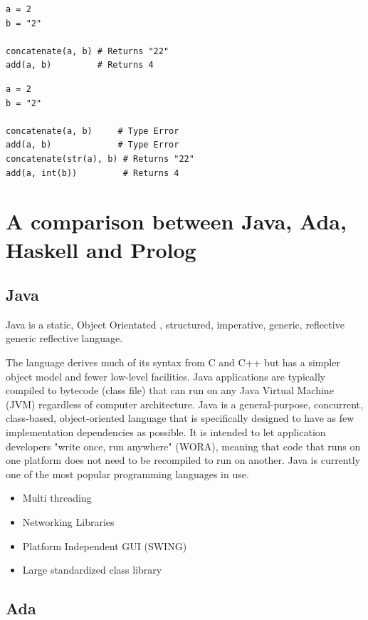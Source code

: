 \documentclass[a4paper,oneside]{report}
\begin{document}
\begin{lstlisting}[label=some-code,caption=Weak Typing] 
a = 2
b = "2"
 
concatenate(a, b) # Returns "22"
add(a, b)         # Returns 4
\end{lstlisting}

\begin{lstlisting}[label=some-code,caption=Strong Typing] 
a = 2
b = "2"
 
concatenate(a, b)     # Type Error
add(a, b)             # Type Error
concatenate(str(a), b) # Returns "22"
add(a, int(b))         # Returns 4
\end{lstlisting}


\section{A comparison between Java, Ada, Haskell and Prolog}


	\subsection{Java}
	
	Java is a static, Object Orientated , structured, imperative, generic, reflective generic reflective language. 
	
	The language derives much of its syntax from C and C++ but has a simpler object model and fewer low-level facilities. Java applications are typically compiled to bytecode (class file) that can run on any Java Virtual Machine (JVM) regardless of computer architecture. Java is a general-purpose, concurrent, class-based, object-oriented language that is specifically designed to have as few implementation dependencies as possible. It is intended to let application developers "write once, run anywhere" (WORA), meaning that code that runs on one platform does not need to be recompiled to run on another. Java is currently one of the most popular programming languages in use.
	
	
	\begin{itemize}
	\item Multi threading
	\item Networking Libraries
	\item Platform Independent GUI (SWING)
	\item Large standardized class library
	\end{itemize}
	

	\subsection{Ada}
\end{document}
